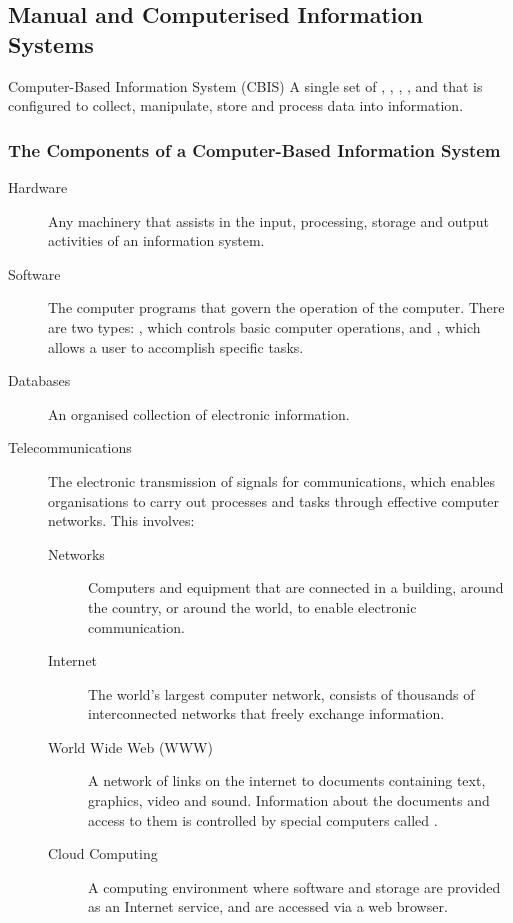 \documentclass[\main/notes.tex]{subfiles}
\begin{document}
			\subsection{Manual and Computerised Information Systems}
				\begin{definition}{Computer-Based Information System (CBIS)}
					A single set of , , , ,  and  that is configured to collect, manipulate, store and process data into information. 
				\end{definition}
				\subsubsection*{The Components of a Computer-Based Information System}
					\begin{description}
						\item[Hardware] Any machinery that assists in the input, processing, storage and output activities of an information system. 
						\item[Software] The computer programs that govern the operation of the computer. There are two types: , which controls basic computer operations, and , which allows a user to accomplish specific tasks.
						\item[Databases] An organised collection of electronic information.
						\item[Telecommunications] The electronic transmission of signals for communications, which enables organisations to carry out processes and tasks through effective computer networks. This involves:
							\begin{description}
								\item[Networks] Computers and equipment that are connected in a building, around the country, or around the world, to enable electronic communication.
								\item[Internet] The world's largest computer network, consists of thousands of interconnected networks that freely exchange information.
								\item[World Wide Web (WWW)] A network of links on the internet to documents containing text, graphics, video and sound. Information about the documents and access to them is controlled by special computers called .
								\item[Cloud Computing] A computing environment where software and storage are provided as an Internet service, and are accessed via a web browser.

\end{description}
\end{description}
\end{document}
